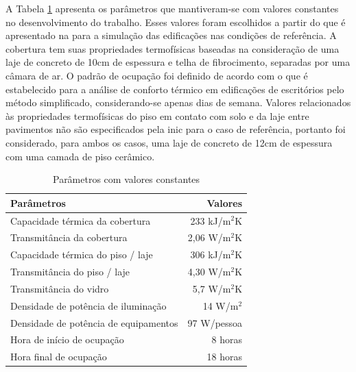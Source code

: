 \documentclass[brazil,hardcopy,openany]{ufscthesis} %
\begin{document}
A Tabela \ref{table:paramconst} apresenta os parâmetros que mantiveram-se com valores constantes no desenvolvimento do trabalho. Esses valores foram escolhidos a partir do que é apresentado na  para a simulação das edificações nas condições de referência. A cobertura tem suas propriedades termofísicas baseadas na consideração de uma laje de concreto de 10cm de espessura e telha de fibrocimento, separadas por uma câmara de ar. O padrão de ocupação foi definido de acordo com o que é estabelecido para a análise de conforto térmico em edificações de escritórios pelo método simplificado, considerando-se apenas dias de semana. Valores relacionados às propriedades termofísicas do piso em contato com solo e da laje entre pavimentos não são especificados pela \acrshort{inic} para o caso de referência, portanto foi considerado, para ambos os casos, uma laje de concreto de 12cm de espessura com uma camada de piso cerâmico.

\begin{table}[h]
	\centering
	\caption{Parâmetros com valores constantes}
	\label{table:paramconst}
	\begin{tabular}{|l |r |}
		\hline
		\textbf{Parâmetros} & \textbf{Valores} \\
		\hline
		Capacidade térmica da cobertura & 233 kJ/m$^2$K \\
		\hline
		Transmitância da cobertura & 2,06 W/m$^2$K \\
		\hline
		Capacidade térmica do piso / laje & 306 kJ/m$^2$K \\
		\hline
		Transmitância do piso / laje & 4,30 W/m$^2$K \\
		\hline
		Transmitância do vidro & 5,7 W/m$^2$K \\
		\hline 
		Densidade de potência de iluminação & 14 W/m$^2$ \\
		\hline 
		Densidade de potência de equipamentos & 97 W/pessoa \\
		\hline 
		Hora de início de ocupação & 8 horas \\
		\hline 
		Hora final de ocupação & 18 horas \\
		\hline 
	\end{tabular}
\end{table}
\end{document}
